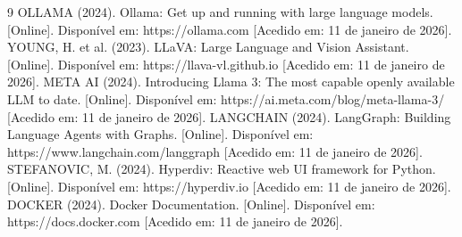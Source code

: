 \documentclass[a4paper,12pt]{scrreprt}
\begin{document}


\renewcommand\bibname{Referências}

\begin{thebibliography}{9}
OLLAMA (2024). Ollama: Get up and running with large language models. [Online]. Disponível em: https://ollama.com [Acedido em: 11 de janeiro de 2026].
YOUNG, H. et al. (2023). LLaVA: Large Language and Vision Assistant. [Online]. Disponível em: https://llava-vl.github.io [Acedido em: 11 de janeiro de 2026].
META AI (2024). Introducing Llama 3: The most capable openly available LLM to date. [Online]. Disponível em: https://ai.meta.com/blog/meta-llama-3/ [Acedido em: 11 de janeiro de 2026].
LANGCHAIN (2024). LangGraph: Building Language Agents with Graphs. [Online]. Disponível em: https://www.langchain.com/langgraph [Acedido em: 11 de janeiro de 2026].
STEFANOVIC, M. (2024). Hyperdiv: Reactive web UI framework for Python. [Online]. Disponível em: https://hyperdiv.io [Acedido em: 11 de janeiro de 2026].
DOCKER (2024). Docker Documentation. [Online]. Disponível em: https://docs.docker.com [Acedido em: 11 de janeiro de 2026].
\end{thebibliography}



\renewcommand{\nomname}{Lista de Siglas e Acrónimos}
\end{document}
